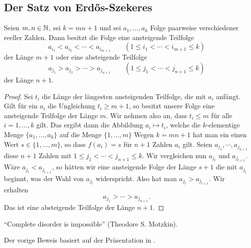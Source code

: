 \subsection{Der Satz von Erd\H{os}-Szekeres}


\begin{thm} 
	Seien $m, n \in \mathbb{N}$, sei $k=mn+1$ und sei $a_1,\ldots,a_k$ Folge paarweise verschiedener reeller Zahlen. Dann besitzt die Folge eine ansteigende Teilfolge 
	\[
			a_{i_1}  < a_{i_2} < \cdots < a_{i_{m+1}} \qquad (1 \le i_1 < \cdots < i_{m+1} \le k)
	\]
	der Länge $m+1$ oder eine absteigende Teilfolge 
	\[
		 a_{j_1} > a_{j_2} > \cdots > a_{j_{n+1}} \qquad (1 \le j_1 < \cdots < j_{n+1} \le k)
	\]
	der  Länge $n+1$. 
\end{thm} 
\begin{proof}
	Sei $t_i$ die Länge der längesten ansteigenden Teilfolge, die mit $a_i$ anfängt. Gilt für ein $a_i$ die Ungleichung $t_i \ge m+1$, so besitzt unsere Folge eine ansteigende Teilfolge der Länge $m$. Wir nehmen also an, dass $t_i \le m$ für alle $i=1,\ldots, k$ gilt. Das ergibt dann die Abbildung $a_i \mapsto t_i$, welche die $k$-elementige Menge $\{a_1,\ldots,a_k\}$ auf die Menge $\{1,\ldots,m\}$  Wegen $k=mn+1$ hat man ein einen Wert $s \in \{1,\ldots,m\}$, so dass $f(a_i) = s$ für $n+1$ Zahlen $a_i$ gilt. Seien $a_{j_1}, \cdots ,  a_{j_{n+1}}$ diese $n+1$ Zahlen mit $1 \le j_1 < \cdots < j_{n+1} \le k$. Wir vergleichen nun $a_{j_t}$ und $a_{j_{t+1}}$. Wäre $a_{j_t} < a_{j_{t+1}}$, so hätten wir eine ansteigende Folge der Länge $s+1$ die mit $a_{j_t}$ beginnt, was der Wahl von $a_{j_t}$ widerspricht. Also hat man $a_{j_t} > a_{j_{t+1}}$. Wir erhalten 
	\[
		a_{j_1} > \cdots > a_{j_{n+1}}.
	\]
	Das ist eine absteigende Teilfolge der Länge $n+1$. 
\end{proof} 

\begin{bem}
	``Complete disorder is impossible'' (Theodore S. Motzkin). 
\end{bem} 

\begin{bem}
	Der vorige Beweis basiert auf der Präsentation in \cite{AZ02}. 
\end{bem} 



